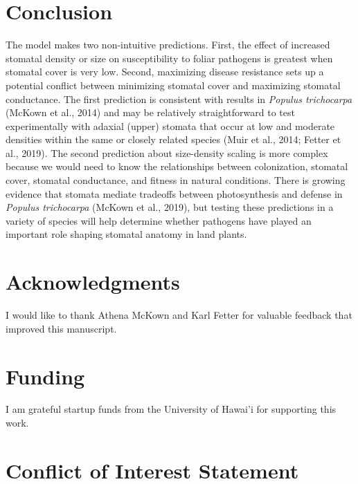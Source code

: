 \documentclass[utf8]{frontiersSCNS}
\begin{document}
\hypertarget{conclusion}{%
\section*{Conclusion}\label{conclusion}}

The model makes two non-intuitive predictions. First, the effect of
increased stomatal density or size on susceptibility to foliar pathogens
is greatest when stomatal cover is very low. Second, maximizing disease
resistance sets up a potential conflict between minimizing stomatal
cover and maximizing stomatal conductance. The first prediction is
consistent with results in \emph{Populus trichocarpa} (McKown et al.,
2014) and may be relatively straightforward to test experimentally with
adaxial (upper) stomata that occur at low and moderate densities within
the same or closely related species (Muir et al., 2014; Fetter et al.,
2019). The second prediction about size-density scaling is more complex
because we would need to know the relationships between colonization,
stomatal cover, stomatal conductance, and fitness in natural conditions.
There is growing evidence that stomata mediate tradeoffs between
photosynthesis and defense in \emph{Populus trichocarpa} (McKown et al.,
2019), but testing these predictions in a variety of species will help
determine whether pathogens have played an important role shaping
stomatal anatomy in land plants.

\hypertarget{acknowledgments}{%
\section*{Acknowledgments}\label{acknowledgments}}

I would like to thank Athena McKown and Karl Fetter for valuable
feedback that improved this manuscript.

\hypertarget{funding}{%
\section*{Funding}\label{funding}}

I am grateful startup funds from the University of Hawai'i for
supporting this work.

\hypertarget{conflict-of-interest-statement}{%
\section*{Conflict of Interest
Statement}\label{conflict-of-interest-statement}}
\end{document}
